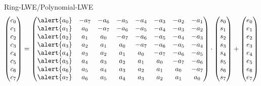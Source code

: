 \documentclass[xcolor=table,10pt,aspectratio=169]{beamer}
\begin{document}
\begin{frame}[label={sec:org07fecd5}]{Ring-LWE/Polynomial-LWE}
\[
\begin{pmatrix}c_{0} \\ c_{1} \\ c_{2} \\ c_{3} \\ c_{4} \\ c_{5} \\ c_{6} \\ c_{7}\end{pmatrix} = 
\begin{pmatrix}
\alert{a_{0}} & -a_{7} & -a_{6} & -a_{5} & -a_{4} & -a_{3} & -a_{2} & -a_{1} \\
\alert{a_{1}} & a_{0} & -a_{7} & -a_{6} & -a_{5} & -a_{4} & -a_{3} & -a_{2} \\
\alert{a_{2}} & a_{1} & a_{0} & -a_{7} & -a_{6} & -a_{5} & -a_{4} & -a_{3} \\
\alert{a_{3}} & a_{2} & a_{1} & a_{0} & -a_{7} & -a_{6} & -a_{5} & -a_{4} \\
\alert{a_{4}} & a_{3} & a_{2} & a_{1} & a_{0} & -a_{7} & -a_{6} & -a_{5} \\
\alert{a_{5}} & a_{4} & a_{3} & a_{2} & a_{1} & a_{0} & -a_{7} & -a_{6} \\
\alert{a_{6}} & a_{5} & a_{4} & a_{3} & a_{2} & a_{1} & a_{0} & -a_{7} \\
\alert{a_{7}} & a_{6} & a_{5} & a_{4} & a_{3} & a_{2} & a_{1} & a_{0}
\end{pmatrix}\cdot
\begin{pmatrix}s_{0} \\ s_{1} \\ s_{2} \\ s_{3} \\ s_{4} \\ s_{5} \\ s_{6} \\ s_{7}\end{pmatrix} +
\begin{pmatrix}e_{0} \\ e_{1} \\ e_{2} \\ e_{3} \\ e_{4} \\ e_{5} \\ e_{6} \\ e_{7}\end{pmatrix}
\]
\end{frame}
\end{document}
